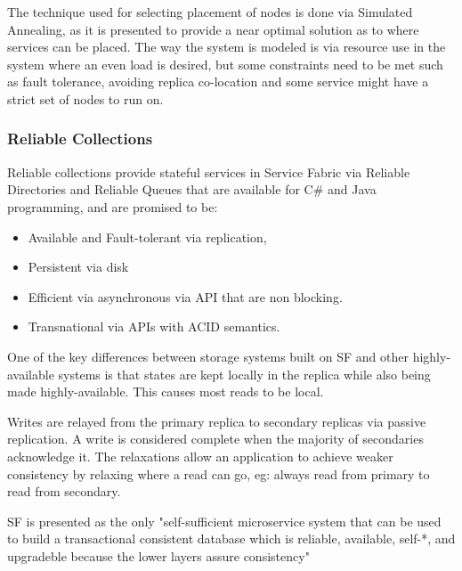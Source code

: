 \documentclass[a4paper,10pt,titlepage]{report}
\begin{document}
    The technique used for selecting placement of nodes is done via Simulated Annealing, as it is presented to provide a near optimal solution as to where services can be placed. The way the system is modeled is via resource use in the system where an even load is desired, but some constraints need to be met such as fault tolerance, avoiding replica co-location and some service might have a strict set of nodes to run on. \\
    \vspace{5mm}

    \subsubsection{Reliable Collections}

    Reliable collections provide stateful services in Service Fabric via Reliable Directories and Reliable Queues that are available for C\# and Java programming, and are promised to be:
    \begin{itemize}
        \item Available and Fault-tolerant via replication,
        \item Persistent via disk
        \item Efficient via asynchronous via API that are non blocking.
        \item Transnational via APIs with ACID semantics.
    \end{itemize}

    One of the key differences between storage systems built on SF and other highly-available systems is that states are kept locally in the replica while also being made highly-available. This causes most reads to be local.\\
    \vspace{5mm}

    Writes are relayed from the primary replica to secondary replicas via passive replication. A write is considered complete when the majority of secondaries acknowledge it. The relaxations allow an application to achieve weaker consistency by relaxing where a read can go, eg: always read from primary to read from secondary. \\
    \vspace{5mm}

    SF is presented as the only "self-sufficient microservice system that can be used to build a transactional consistent database which is reliable, available, self-*, and upgradeble because the lower layers assure consistency"\cite{SFpaper} \\
    \vspace{5mm}
\end{document}
